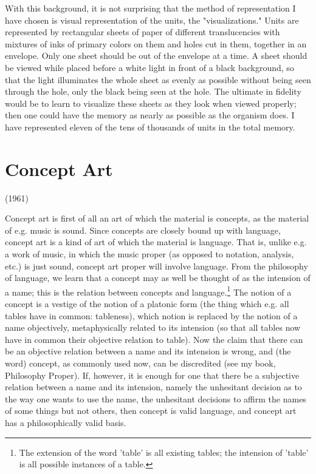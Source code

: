 \documentclass[10pt,twoside]{memoir}
\begin{document}
\begin{enumerate}
{\begin{enumerate}
\begin{sysrules}
\begin{sysrules}
\begin{sysrules}
\begin{sysrules}
{\begin{enumerate}
With this background, it is not surprising that the method of 
representation I have chosen is visual representation of the units, the 
"visualizations." Units are represented by rectangular sheets of paper of 
different translucencies with mixtures of inks of primary colors on them and 
holes cut in them, together in an envelope. Only one sheet should be out of 
the envelope at a time. A sheet should be viewed while placed before a white 
light in front of a black background, so that the light illuminates the whole 
sheet as evenly as possible without being seen through the hole, only the 
black being seen at the hole. The ultimate in fidelity would be to learn to 
visualize these sheets as they look when viewed properly; then one could 
have the memory as nearly as possible as the organism does. I have 
represented eleven of the tens of thousands of units in the total memory. 


\chapter{Concept Art}
{ \raggedleft (1961) \par }


Concept art is first of all an art of which the material is concepts, as the 
material of e.g. music is sound. Since concepts are closely bound up with 
language, concept art is a kind of art of which the material is language. That 
is, unlike e.g. a work of music, in which the music proper (as opposed to 
notation, analysis, etc.) is just sound, concept art proper will involve 
language. From the philosophy of language, we learn that a concept may as 
well be thought of as the intension of a name; this is the relation between 
concepts and language.\footnote{The extension of the word 'table' is all 
existing tables; the intension of 'table' is all possible instances of a table.}
The notion of a concept is a vestige of the notion of 
a platonic form (the thing which e.g. all tables have in common: tableness), 
which notion is replaced by the notion of a name objectively, metaphysically 
related to its intension (so that all tables now have in common their 
objective relation to table). Now the claim that there can be an objective 
relation between a name and its intension is wrong, and (the word) concept, 
as commonly used now, can be discredited (see my book, Philosophy 
Proper). If, however, it is enough for one that there be a subjective relation 
between a name and its intension, namely the unhesitant decision as to the 
way one wants to use the name, the unhesitant decisions to affirm the names 
of some things but not others, then concept is valid language, and concept 
art has a philosophically valid basis. 


\end{enumerate}}
\end{sysrules}
\end{sysrules}
\end{sysrules}
\end{sysrules}
\end{enumerate}}
\end{enumerate}
\end{document}
